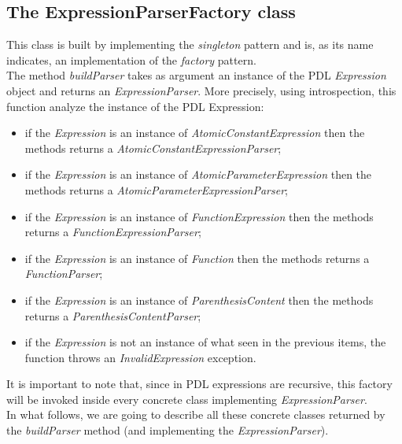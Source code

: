 \documentclass[a4paper,11pt] {ivoa}
\begin{document}
\subsection{The ExpressionParserFactory class}
This class is built by implementing the {\it singleton} pattern and is, as its name indicates, an implementation of the {\it factory} pattern.\\
The method {\it buildParser} takes as argument an instance of the PDL {\it Expression} object and returns an {\it ExpressionParser}.
More precisely, using introspection, this function analyze the instance of the PDL Expression:
\begin{itemize}
\item if the {\it Expression} is an instance of {\it AtomicConstantExpression} then the methods returns a {\it AtomicConstantExpressionParser};
\item if the {\it Expression} is an instance of {\it AtomicParameterExpression} then the methods returns a {\it AtomicParameterExpressionParser};
\item if the {\it Expression} is an instance of {\it FunctionExpression} then the methods returns a {\it FunctionExpressionParser};
\item if the {\it Expression} is an instance of {\it Function} then the methods returns a {\it FunctionParser};
\item if the {\it Expression} is an instance of {\it ParenthesisContent} then the methods returns a {\it ParenthesisContentParser};
\item if the {\it Expression} is not an instance of what seen in the previous items, the function throws an {\it InvalidExpression} exception.
\end{itemize} 
It is important to note that, since in PDL expressions are recursive, this factory will be invoked inside every concrete class implementing {\it ExpressionParser}.\\
In what follows, we are going to describe all these concrete classes returned by the  {\it buildParser} method (and implementing the {\it ExpressionParser}).
\end{document}
